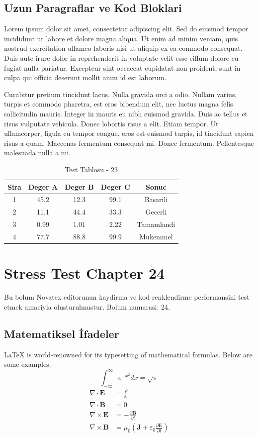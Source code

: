 \documentclass[12pt,a4paper]{article}
\begin{document}
\subsection{Uzun Paragraflar ve Kod Bloklari}
Lorem ipsum dolor sit amet, consectetur adipiscing elit. Sed do eiusmod tempor incididunt ut labore et dolore magna aliqua. Ut enim ad minim veniam, quis nostrud exercitation ullamco laboris nisi ut aliquip ex ea commodo consequat. Duis aute irure dolor in reprehenderit in voluptate velit esse cillum dolore eu fugiat nulla pariatur. Excepteur sint occaecat cupidatat non proident, sunt in culpa qui officia deserunt mollit anim id est laborum.

Curabitur pretium tincidunt lacus. Nulla gravida orci a odio. Nullam varius, turpis et commodo pharetra, est eros bibendum elit, nec luctus magna felis sollicitudin mauris. Integer in mauris eu nibh euismod gravida. Duis ac tellus et risus vulputate vehicula. Donec lobortis risus a elit. Etiam tempor. Ut ullamcorper, ligula eu tempor congue, eros est euismod turpis, id tincidunt sapien risus a quam. Maecenas fermentum consequat mi. Donec fermentum. Pellentesque malesuada nulla a mi.

\begin{table}[h!]
\centering
\begin{tabular}{|c|c|c|c|c|}
\hline
\textbf{Sira} & \textbf{Deger A} & \textbf{Deger B} & \textbf{Deger C} & \textbf{Sonuc} \\
\hline
1 & 45.2 & 12.3 & 99.1 & Basarili \\
2 & 11.1 & 44.4 & 33.3 & Gecerli \\
3 & 0.99 & 1.01 & 2.22 & Tamamlandi \\
4 & 77.7 & 88.8 & 99.9 & Mukemmel \\
\hline
\end{tabular}
\caption{Test Tablosu - 23}
\end{table}

\newpage
\section{Stress Test Chapter 24}
Bu bolum Novatex editorunun kaydirma ve kod renklendirme performansini test etmek amaciyla olusturulmustur. Bolum numarasi: 24.

\subsection{Matematiksel İfadeler}
\LaTeX{} is world-renowned for its typesetting of mathematical formulas. Below are some examples.
\begin{equation}
\int_{-\infty}^{\infty} e^{-x^2} dx = \sqrt{\pi}
\end{equation}
\begin{align}
\nabla \cdot \mathbf{E} &= \frac{\rho}{\varepsilon_0} \\
\nabla \cdot \mathbf{B} &= 0 \\
\nabla \times \mathbf{E} &= -\frac{\partial \mathbf{B}}{\partial t} \\
\nabla \times \mathbf{B} &= \mu_0\left(\mathbf{J} + \varepsilon_0 \frac{\partial \mathbf{E}}{\partial t}\right)
\end{align}
\end{document}
